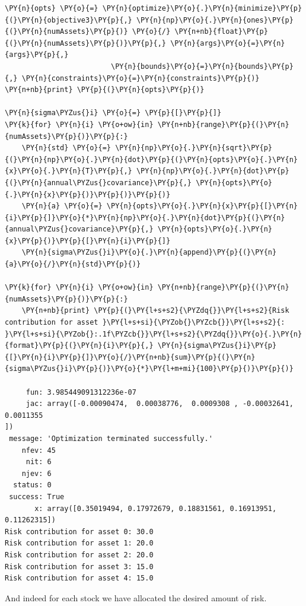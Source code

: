 \begin{tcolorbox}[breakable, size=fbox, boxrule=1pt, pad at break*=1mm,colback=cellbackground, colframe=cellborder]
\begin{Verbatim}[commandchars=\\\{\}]
\PY{n}{opts} \PY{o}{=} \PY{n}{optimize}\PY{o}{.}\PY{n}{minimize}\PY{p}{(}\PY{n}{objective3}\PY{p}{,} \PY{n}{np}\PY{o}{.}\PY{n}{ones}\PY{p}{(}\PY{n}{numAssets}\PY{p}{)} \PY{o}{/} \PY{n+nb}{float}\PY{p}{(}\PY{n}{numAssets}\PY{p}{)}\PY{p}{,} \PY{n}{args}\PY{o}{=}\PY{n}{args}\PY{p}{,}
                         \PY{n}{bounds}\PY{o}{=}\PY{n}{bounds}\PY{p}{,} \PY{n}{constraints}\PY{o}{=}\PY{n}{constraints}\PY{p}{)}
\PY{n+nb}{print} \PY{p}{(}\PY{n}{opts}\PY{p}{)}  

\PY{n}{sigma\PYZus{}i} \PY{o}{=} \PY{p}{[}\PY{p}{]}
\PY{k}{for} \PY{n}{i} \PY{o+ow}{in} \PY{n+nb}{range}\PY{p}{(}\PY{n}{numAssets}\PY{p}{)}\PY{p}{:}
    \PY{n}{std} \PY{o}{=} \PY{n}{np}\PY{o}{.}\PY{n}{sqrt}\PY{p}{(}\PY{n}{np}\PY{o}{.}\PY{n}{dot}\PY{p}{(}\PY{n}{opts}\PY{o}{.}\PY{n}{x}\PY{o}{.}\PY{n}{T}\PY{p}{,} \PY{n}{np}\PY{o}{.}\PY{n}{dot}\PY{p}{(}\PY{n}{annual\PYZus{}covariance}\PY{p}{,} \PY{n}{opts}\PY{o}{.}\PY{n}{x}\PY{p}{)}\PY{p}{)}\PY{p}{)}
    \PY{n}{a} \PY{o}{=} \PY{n}{opts}\PY{o}{.}\PY{n}{x}\PY{p}{[}\PY{n}{i}\PY{p}{]}\PY{o}{*}\PY{n}{np}\PY{o}{.}\PY{n}{dot}\PY{p}{(}\PY{n}{annual\PYZus{}covariance}\PY{p}{,} \PY{n}{opts}\PY{o}{.}\PY{n}{x}\PY{p}{)}\PY{p}{[}\PY{n}{i}\PY{p}{]}
    \PY{n}{sigma\PYZus{}i}\PY{o}{.}\PY{n}{append}\PY{p}{(}\PY{n}{a}\PY{o}{/}\PY{n}{std}\PY{p}{)}

\PY{k}{for} \PY{n}{i} \PY{o+ow}{in} \PY{n+nb}{range}\PY{p}{(}\PY{n}{numAssets}\PY{p}{)}\PY{p}{:}
    \PY{n+nb}{print} \PY{p}{(}\PY{l+s+s2}{\PYZdq{}}\PY{l+s+s2}{Risk contribution for asset }\PY{l+s+si}{\PYZob{}\PYZcb{}}\PY{l+s+s2}{: }\PY{l+s+si}{\PYZob{}:.1f\PYZcb{}}\PY{l+s+s2}{\PYZdq{}}\PY{o}{.}\PY{n}{format}\PY{p}{(}\PY{n}{i}\PY{p}{,} \PY{n}{sigma\PYZus{}i}\PY{p}{[}\PY{n}{i}\PY{p}{]}\PY{o}{/}\PY{n+nb}{sum}\PY{p}{(}\PY{n}{sigma\PYZus{}i}\PY{p}{)}\PY{o}{*}\PY{l+m+mi}{100}\PY{p}{)}\PY{p}{)}

     fun: 3.985449091312236e-07
     jac: array([-0.00090474,  0.00038776,  0.0009308 , -0.00032641,  0.0011355
])
 message: 'Optimization terminated successfully.'
    nfev: 45
     nit: 6
    njev: 6
  status: 0
 success: True
       x: array([0.35019494, 0.17972679, 0.18831561, 0.16913951, 0.11262315])
Risk contribution for asset 0: 30.0
Risk contribution for asset 1: 20.0
Risk contribution for asset 2: 20.0
Risk contribution for asset 3: 15.0
Risk contribution for asset 4: 15.0
    \end{Verbatim}
\end{tcolorbox}
And indeed for each stock we have allocated the desired amount of risk.

